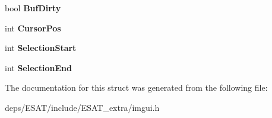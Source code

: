 \begin{DoxyCompactItemize}
\mbox{\label{struct_im_gui_text_edit_callback_data_a1ba304d589e00bece6400d43451d864e}} 
bool {\bfseries Buf\+Dirty}
\item 
\mbox{\label{struct_im_gui_text_edit_callback_data_aded0e6e87c2dcb66546ae6298e5a8a01}} 
int {\bfseries Cursor\+Pos}
\item 
\mbox{\label{struct_im_gui_text_edit_callback_data_a1634bec3717f7e386033051cf604efed}} 
int {\bfseries Selection\+Start}
\item 
\mbox{\label{struct_im_gui_text_edit_callback_data_af3371b7f36bd6c2b528b033bdb1785a2}} 
int {\bfseries Selection\+End}
\end{DoxyCompactItemize}


The documentation for this struct was generated from the following file\+:\begin{DoxyCompactItemize}
\item 
deps/\+E\+S\+A\+T/include/\+E\+S\+A\+T\+\_\+extra/imgui.\+h\end{DoxyCompactItemize}
